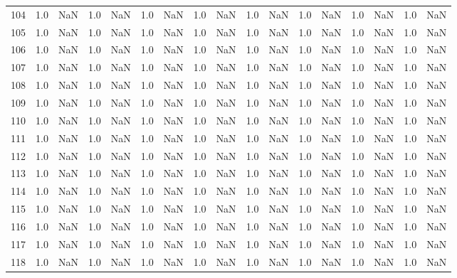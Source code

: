 \begin{tabular}{lrrrrrrrrrrrrrrrr}
    104 &  1.0 & NaN &   1.0 &   NaN &   1.0 &   NaN &   1.0 &   NaN &   1.0 &   NaN &   1.0 &   NaN &   1.0 &   NaN &   1.0 &   NaN \\
    105 &  1.0 & NaN &   1.0 &   NaN &   1.0 &   NaN &   1.0 &   NaN &   1.0 &   NaN &   1.0 &   NaN &   1.0 &   NaN &   1.0 &   NaN \\
    106 &  1.0 & NaN &   1.0 &   NaN &   1.0 &   NaN &   1.0 &   NaN &   1.0 &   NaN &   1.0 &   NaN &   1.0 &   NaN &   1.0 &   NaN \\
    107 &  1.0 & NaN &   1.0 &   NaN &   1.0 &   NaN &   1.0 &   NaN &   1.0 &   NaN &   1.0 &   NaN &   1.0 &   NaN &   1.0 &   NaN \\
    108 &  1.0 & NaN &   1.0 &   NaN &   1.0 &   NaN &   1.0 &   NaN &   1.0 &   NaN &   1.0 &   NaN &   1.0 &   NaN &   1.0 &   NaN \\
    109 &  1.0 & NaN &   1.0 &   NaN &   1.0 &   NaN &   1.0 &   NaN &   1.0 &   NaN &   1.0 &   NaN &   1.0 &   NaN &   1.0 &   NaN \\
    110 &  1.0 & NaN &   1.0 &   NaN &   1.0 &   NaN &   1.0 &   NaN &   1.0 &   NaN &   1.0 &   NaN &   1.0 &   NaN &   1.0 &   NaN \\
    111 &  1.0 & NaN &   1.0 &   NaN &   1.0 &   NaN &   1.0 &   NaN &   1.0 &   NaN &   1.0 &   NaN &   1.0 &   NaN &   1.0 &   NaN \\
    112 &  1.0 & NaN &   1.0 &   NaN &   1.0 &   NaN &   1.0 &   NaN &   1.0 &   NaN &   1.0 &   NaN &   1.0 &   NaN &   1.0 &   NaN \\
    113 &  1.0 & NaN &   1.0 &   NaN &   1.0 &   NaN &   1.0 &   NaN &   1.0 &   NaN &   1.0 &   NaN &   1.0 &   NaN &   1.0 &   NaN \\
    114 &  1.0 & NaN &   1.0 &   NaN &   1.0 &   NaN &   1.0 &   NaN &   1.0 &   NaN &   1.0 &   NaN &   1.0 &   NaN &   1.0 &   NaN \\
    115 &  1.0 & NaN &   1.0 &   NaN &   1.0 &   NaN &   1.0 &   NaN &   1.0 &   NaN &   1.0 &   NaN &   1.0 &   NaN &   1.0 &   NaN \\
    116 &  1.0 & NaN &   1.0 &   NaN &   1.0 &   NaN &   1.0 &   NaN &   1.0 &   NaN &   1.0 &   NaN &   1.0 &   NaN &   1.0 &   NaN \\
    117 &  1.0 & NaN &   1.0 &   NaN &   1.0 &   NaN &   1.0 &   NaN &   1.0 &   NaN &   1.0 &   NaN &   1.0 &   NaN &   1.0 &   NaN \\
    118 &  1.0 & NaN &   1.0 &   NaN &   1.0 &   NaN &   1.0 &   NaN &   1.0 &   NaN &   1.0 &   NaN &   1.0 &   NaN &   1.0 &   NaN \\

\end{tabular}
